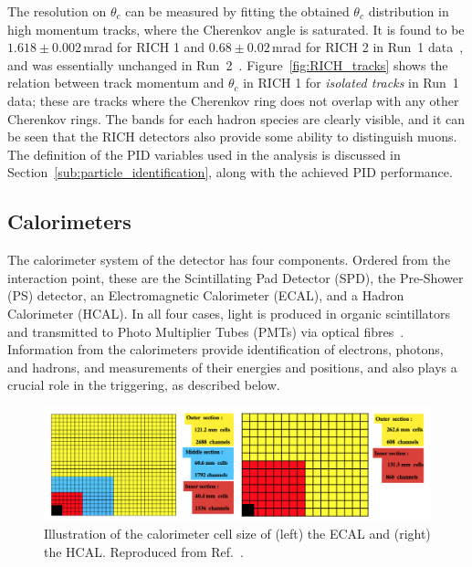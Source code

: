 The resolution on $\theta_c$ can be measured by fitting the obtained $\theta_c$ distribution in high momentum tracks, where the Cherenkov angle is saturated. It is found to be $1.618 \pm 0.002$\,mrad for RICH 1 and $0.68 \pm 0.02$\,mrad for RICH 2 in Run~1 data~\cite{RICH-Performance}, and was essentially unchanged in Run~2~\cite{RICH-Performance-2}. Figure~\ref{fig:RICH_tracks} shows the relation between track momentum and $\theta_c$ in RICH 1 for \emph{isolated tracks} in Run~1 data; these are tracks where the Cherenkov ring does not overlap with any other Cherenkov rings. The bands for each hadron species are clearly visible, and it can be seen that the RICH detectors also provide some ability to distinguish muons. The definition of the PID variables used in the analysis is discussed in Section~\ref{sub:particle_identification}, along with the achieved PID performance.

\subsection{Calorimeters} %
\label{sub:calorimeters}

The calorimeter system of the \lhcb detector has four components. Ordered from the interaction point, these are the Scintillating Pad Detector (SPD), the Pre-Shower (PS) detector, an Electromagnetic Calorimeter (ECAL), and a Hadron Calorimeter (HCAL). In all four cases, light is produced in organic scintillators and transmitted to Photo Multiplier Tubes (PMTs) via optical fibres~\cite{LHCb-detector}. Information from the calorimeters provide identification of electrons, photons, and hadrons, and measurements of their energies and positions, and also plays a crucial role in the triggering, as described below. 

\begin{figure}[tb]
    \centering
    \includegraphics[width=0.9\columnwidth]{figures/detector/cell_modules.png}
    \caption{Illustration of the calorimeter cell size of (left) the ECAL and (right) the HCAL. Reproduced from Ref.~\cite{CAL-TDR}.}
    \label{fig:cal_cells}
\end{figure}

